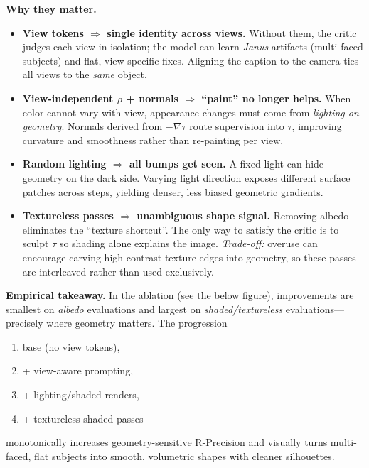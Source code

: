\begin{enrichment}
\begin{enrichment}
        \textbf{Why they matter.}
        \begin{itemize}
            \item \textbf{View tokens $\Rightarrow$ single identity across views.} Without them, the critic judges each view in isolation; the model can learn \emph{Janus} artifacts (multi-faced subjects) and flat, view-specific fixes. Aligning the caption to the camera ties all views to the \emph{same} object.
            \item \textbf{View-independent $\rho$ + normals $\Rightarrow$ “paint” no longer helps.} When color cannot vary with view, appearance changes must come from \emph{lighting on geometry}. Normals derived from $-\nabla\tau$ route supervision into $\tau$, improving curvature and smoothness rather than re-painting per view.
            \item \textbf{Random lighting $\Rightarrow$ all bumps get seen.} A fixed light can hide geometry on the dark side. Varying light direction exposes different surface patches across steps, yielding denser, less biased geometric gradients.
            \item \textbf{Textureless passes $\Rightarrow$ unambiguous shape signal.} Removing albedo eliminates the “texture shortcut”. The only way to satisfy the critic is to sculpt $\tau$ so shading alone explains the image. \emph{Trade-off:} overuse can encourage carving high-contrast texture edges into geometry, so these passes are interleaved rather than used exclusively.
        \end{itemize}
        
        \textbf{Empirical takeaway.} In the ablation (see the below figure), improvements are smallest on \emph{albedo} evaluations and largest on \emph{shaded/textureless} evaluations—precisely where geometry matters. The progression
        \begin{enumerate}
            \item base (no view tokens),
            \item + view-aware prompting,
            \item + lighting/shaded renders,
            \item + textureless shaded passes
        \end{enumerate}
        monotonically increases geometry-sensitive R-Precision and visually turns multi-faced, flat subjects into smooth, volumetric shapes with cleaner silhouettes.
        

\end{enrichment}
\end{enrichment}
